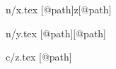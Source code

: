 \begin{filecontents*}{n/x.tex}
[@path]{z}[@path]
\end{filecontents*}
\begin{filecontents*}{n/y.tex}
[@path][@path]
\end{filecontents*}
\begin{filecontents*}{c/z.tex}
[@path]
\end{filecontents*}
\documentclass{article}
\usepackage{import}

[@path]

[@path]{y}[@path]


